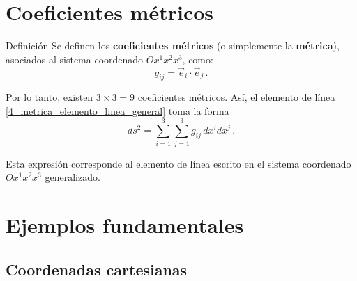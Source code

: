 \documentclass[../apunte_mecanica_clasica.tex]{subfiles}%
\begin{document}
\section{Coeficientes métricos}

\begin{apuntebloque}{Definición}
Se definen los \textbf{coeficientes métricos} (o simplemente la 
\textbf{métrica}), asociados al sistema coordenado $Ox^1x^2x^3$, como:
\begin{equation}\label{4_metrica_g}
    g_{ij} = \vec{e}_i \cdot \vec{e}_j \,.
\end{equation}
\end{apuntebloque}

Por lo tanto, existen $3 \times 3 = 9$ coeficientes métricos. 
Así, el elemento de línea \eqref{4_metrica_elemento_linea_general} toma la forma
\begin{equation}\label{4_metrica_elemento_linea_sistema_coordenado_generalizado}
    ds^2 = \sum_{i=1}^3 \sum_{j=1}^3 g_{ij} \, dx^i dx^j \,.
\end{equation}

Esta expresión corresponde al elemento de línea escrito en el 
sistema coordenado $Ox^1x^2x^3$ generalizado.

\section{Ejemplos fundamentales}

\subsection{Coordenadas cartesianas}
\end{document}
